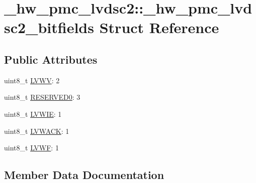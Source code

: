 \hypertarget{struct__hw__pmc__lvdsc2_1_1__hw__pmc__lvdsc2__bitfields}{}\section{\+\_\+hw\+\_\+pmc\+\_\+lvdsc2\+:\+:\+\_\+hw\+\_\+pmc\+\_\+lvdsc2\+\_\+bitfields Struct Reference}
\label{struct__hw__pmc__lvdsc2_1_1__hw__pmc__lvdsc2__bitfields}
\subsection*{Public Attributes}
\begin{DoxyCompactItemize}
\item 
uint8\+\_\+t \hyperlink{struct__hw__pmc__lvdsc2_1_1__hw__pmc__lvdsc2__bitfields_aba9bedb2fb2e932756fc94aa2292ff62}{L\+V\+WV}\+: 2
\item 
uint8\+\_\+t \hyperlink{struct__hw__pmc__lvdsc2_1_1__hw__pmc__lvdsc2__bitfields_a03f14c044354f43e476f1ff63d83a966}{R\+E\+S\+E\+R\+V\+E\+D0}\+: 3
\item 
uint8\+\_\+t \hyperlink{struct__hw__pmc__lvdsc2_1_1__hw__pmc__lvdsc2__bitfields_ae8e8022d6fd80dec8a2188579859fb03}{L\+V\+W\+IE}\+: 1
\item 
uint8\+\_\+t \hyperlink{struct__hw__pmc__lvdsc2_1_1__hw__pmc__lvdsc2__bitfields_abc3cae2452e567559513b5d396969972}{L\+V\+W\+A\+CK}\+: 1
\item 
uint8\+\_\+t \hyperlink{struct__hw__pmc__lvdsc2_1_1__hw__pmc__lvdsc2__bitfields_a3a0929512ed46b7faa6419ce661138b9}{L\+V\+WF}\+: 1
\end{DoxyCompactItemize}


\subsection{Member Data Documentation}
